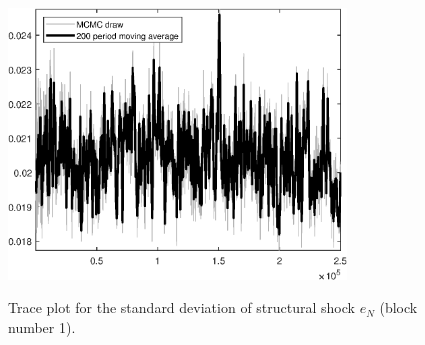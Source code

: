 \begin{figure}[H]
\centering
  \includegraphics[width=0.8\textwidth]{BRS/graphs/TracePlot_SE_e_N_blck_1}\\
    \caption{Trace plot for the standard deviation of structural shock ${e_N}$ (block number 1).}
\end{figure}
